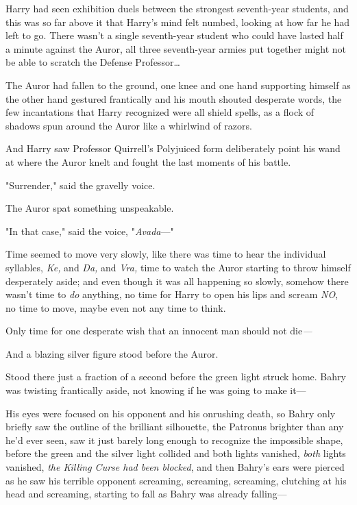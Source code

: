 Harry had seen exhibition duels between the strongest seventh-year students,
and this was so far above it that Harry's mind felt numbed, looking at how far
he had left to go. There wasn't a single seventh-year student who could have
lasted half a minute against the Auror, all three seventh-year armies put
together might not be able to scratch the Defense Professor{\ldots}

The Auror had fallen to the ground, one knee and one hand supporting himself as
the other hand gestured frantically and his mouth shouted desperate words, the
few incantations that Harry recognized were all shield spells, as a flock of
shadows spun around the Auror like a whirlwind of razors.

And Harry saw Professor Quirrell's Polyjuiced form deliberately point his wand
at where the Auror knelt and fought the last moments of his battle.

"Surrender," said the gravelly voice.

The Auror spat something unspeakable.

"In that case," said the voice, "\emph{Avada}---"

Time seemed to move very slowly, like there was time to hear the individual
syllables, \emph{Ke,} and \emph{Da,} and \emph{Vra,} time to watch the Auror
starting to throw himself desperately aside; and even though it was all
happening so slowly, somehow there wasn't time to \emph{do} anything, no time
for Harry to open his lips and scream \emph{NO}, no time to move, maybe even
not any time to think.

Only time for one desperate wish that an innocent man should not die\emph{---}

And a blazing silver figure stood before the Auror.

Stood there just a fraction of a second before the green light struck home.
\later
Bahry was twisting frantically aside, not knowing if he was going to make it---

His eyes were focused on his opponent and his onrushing death, so Bahry only
briefly saw the outline of the brilliant silhouette, the Patronus brighter than
any he'd ever seen, saw it just barely long enough to recognize the impossible
shape, before the green and the silver light collided and both lights vanished,
\emph{both} lights vanished, \emph{the Killing Curse had been blocked}, and
then Bahry's ears were pierced as he saw his terrible opponent screaming,
screaming, screaming, clutching at his head and screaming, starting to fall as
Bahry was already falling---


